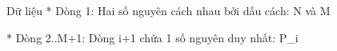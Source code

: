 Dữ liệu
* Dòng 1: Hai số nguyên cách nhau bởi dấu cách: N và M  

   * Dòng 2..M+1: Dòng i+1 chứa 1 số nguyên duy nhất: P\_i